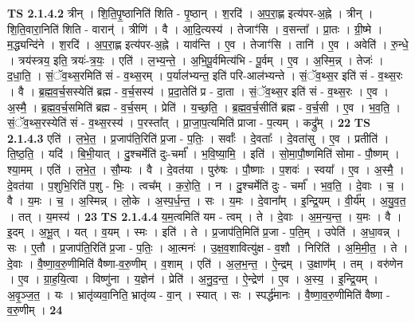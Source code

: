 \documentclass[17pt]{extarticle}
\begin{document}
                  \newline
                                \textbf{ TS 2.1.4.2} \newline
                  त्रीन् । शि॒ति॒पृ॒ष्ठानिति॑ शिति - पृ॒ष्ठान् । श॒रदि॑ । अ॒प॒रा॒ह्ण इत्य॑पर-अ॒ह्ने । त्रीन् । शि॒ति॒वारा॒निति॑ शिति - वारान्॑ । त्रीणि॑ । वै । आ॒दि॒त्यस्य॑ । तेजाꣳ॑सि । व॒सन्ता᳚ । प्रा॒तः । ग्री॒ष्मे । म॒द्ध्यन्दि॑ने । श॒रदि॑ । अ॒प॒रा॒ह्ण इत्य॑पर-अ॒ह्ने । याव॑न्ति । ए॒व । तेजाꣳ॑सि । तानि॑ । ए॒व । अवेति॑ । रु॒न्धे॒ । त्रय॑स्त्रय॒ इति॒ त्रयः॑-त्र॒यः॒ । एति॑ । ल॒भ्य॒न्ते॒ । अ॒भि॒पू॒र्वमित्य॑भि - पू॒र्वम् । ए॒व । अ॒स्मि॒न्न् । तेजः॑ । द॒धा॒ति॒ । सं॒ॅव॒थ्स॒रमिति॑ सं - व॒थ्स॒रम् । प॒र्याल॑भ्यन्त॒ इति॑ परि-आल॑भ्यन्ते । सं॒ॅव॒थ्स॒र इति॑ सं - व॒थ्स॒रः । वै । ब्र॒ह्म॒व॒र्च॒सस्येति॑ ब्रह्म - व॒र्च॒सस्य॑ । प्र॒दा॒तेति॑ प्र - दा॒ता । सं॒ॅव॒थ्स॒र इति॑ सं - व॒थ्स॒रः । ए॒व । अ॒स्मै॒ । ब्र॒ह्म॒व॒र्च॒समिति॑ ब्रह्म - व॒र्च॒सम् । प्रेति॑ । य॒च्छ॒ति॒ । ब्र॒ह्म॒व॒र्च॒सीति॑ ब्रह्म - व॒र्च॒सी । ए॒व । भ॒व॒ति॒ । सं॒ॅव॒थ्स॒रस्येति॑ सं - व॒थ्स॒रस्य॑ । प॒रस्ता᳚त् । प्रा॒जा॒प॒त्यमिति॑ प्राजा - प॒त्यम् । कद्रु᳚म् । \textbf{  22} \newline
                  \newline
                                \textbf{ TS 2.1.4.3} \newline
                  एति॑ । ल॒भे॒त॒ । प्र॒जाप॑ति॒रिति॑ प्र॒जा - प॒तिः॒ । सर्वाः᳚ । दे॒वताः᳚ । दे॒वता॑सु । ए॒व । प्रतीति॑ । ति॒ष्ठ॒ति॒ । यदि॑ । बि॒भी॒यात् । दु॒श्चर्मेति॑ दुः-चर्मा᳚ । भ॒वि॒ष्या॒मि॒ । इति॑ । सो॒मा॒पौ॒ष्णमिति॑ सोमा - पौ॒ष्णम् । श्या॒मम् । एति॑ । ल॒भे॒त॒ । सौ॒म्यः । वै । दे॒वत॑या । पुरु॑षः । पौ॒ष्णाः । प॒शवः॑ । स्वया᳚ । ए॒व । अ॒स्मै॒ । दे॒वत॑या । प॒शुभि॒रिति॑ प॒शु - भिः॒ । त्वच᳚म् । क॒रो॒ति॒ । न । दु॒श्चर्मेति॑ दुः - चर्मा᳚ । भ॒व॒ति॒ । दे॒वाः । च॒ । वै । य॒मः । च॒ । अ॒स्मिन्न् । लो॒के । अ॒स्प॒र्ध॒न्त॒ । सः । य॒मः । दे॒वाना᳚म् । इ॒न्द्रि॒यम् । वी॒र्य᳚म् । अ॒यु॒व॒त॒ । तत् । य॒मस्य॑ । \textbf{  23} \newline
                  \newline
                                \textbf{ TS 2.1.4.4} \newline
                  य॒म॒त्वमिति॑ यम - त्वम् । ते । दे॒वाः । अ॒म॒न्य॒न्त॒ । य॒मः । वै । इ॒दम् । अ॒भू॒त् । यत् । व॒यम् । स्मः । इति॑ । ते । प्र॒जाप॑ति॒मिति॑ प्र॒जा - प॒ति॒म् । उपेति॑ । अ॒धा॒वन्न् । सः । ए॒तौ । प्र॒जाप॑ति॒रिति॑ प्र॒जा - प॒तिः॒ । आ॒त्मनः॑ । उ॒क्ष॒व॒शावित्यु॑क्ष - व॒शौ । निरिति॑ । अ॒मि॒मी॒त॒ । ते । दे॒वाः । वै॒ष्णा॒व॒रु॒णीमिति॑ वैष्णा-व॒रु॒णीम् । व॒शाम् । एति॑ । अ॒ल॒भ॒न्त॒ । ऐ॒न्द्रम् । उ॒क्षाण᳚म् । तम् । वरु॑णेन । ए॒व । ग्रा॒ह॒यि॒त्वा । विष्णु॑ना । य॒ज्ञेन॑ । प्रेति॑ । अ॒नु॒द॒न्त॒ । ऐ॒न्द्रेण॑ । ए॒व । अ॒स्य॒ । इ॒न्द्रि॒यम् । अ॒वृ॒ञ्ज॒त॒ । यः । भ्रातृ॑व्यवा॒निति॒ भ्रातृ॑व्य - वा॒न् । स्यात् । सः । स्पर्द्ध॑मानः । वै॒ष्णा॒व॒रु॒णीमिति॑ वैष्णा - व॒रु॒णीम् । \textbf{  24} \newline
\end{document}
